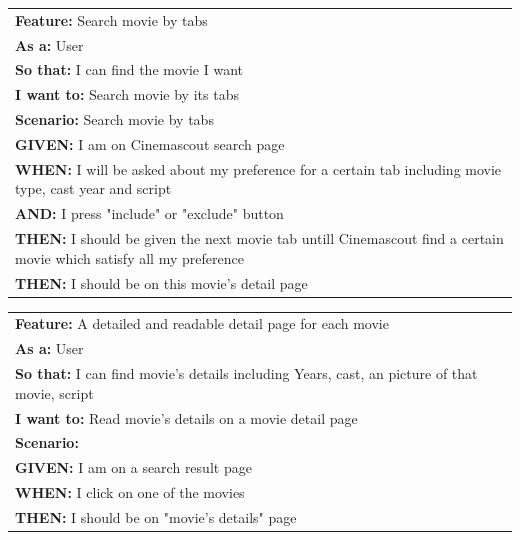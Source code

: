 \documentclass{article}
\begin{document}
\iffalse
\begin{table}[H]
\begin{tabular}{|l|}
\hline
\textbf{Feature:} Search movie by tabs   \\
\textbf{As a:} User\\
\textbf{So that:} I can find the movie I want\\
\textbf{I want to:} Search movie by its tabs\\
\textbf{Scenario:} Search movie by tabs\\
\textbf{GIVEN:} I am on Cinemascout search page\\
\textbf{WHEN:} I will be asked about my preference for a certain tab including movie type, cast year and script\\
\textbf{AND:} I press "include" or "exclude" button\\
\textbf{THEN:} I should be given the next movie tab untill Cinemascout find a certain movie which satisfy all my preference\\
\textbf{THEN:} I should be on this movie's detail page\\
\hline
\end{tabular}
\end{table}

\begin{table}[H]
\begin{tabular}{|l|}
\hline
\textbf{Feature:} A detailed and readable detail page for each movie\\
\textbf{As a:} User\\
\textbf{So that:} I can find movie's details including Years, cast, an picture of that movie, script\\
\textbf{I want to:} Read movie's details on a movie detail page\\
\textbf{Scenario:} \\
\textbf{GIVEN:} I am on a search result page\\
\textbf{WHEN:} I click on one of the movies\\
\textbf{THEN:} I should be on "movie's details" page\\
\hline
\end{tabular}
\end{table}
\end{document}
